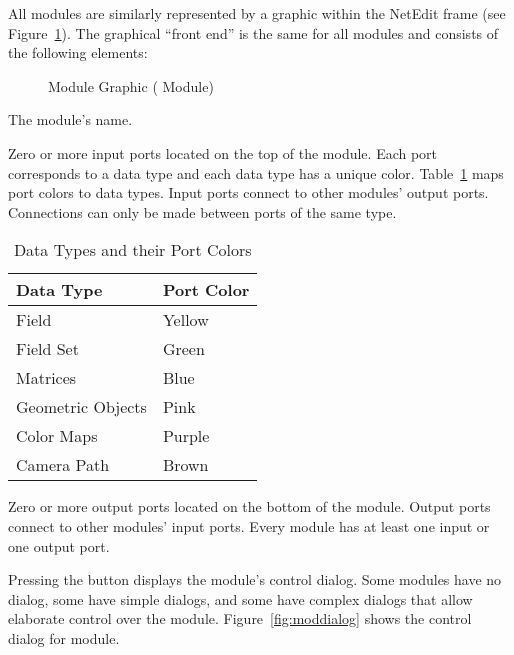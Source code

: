 All modules are similarly represented by a graphic within the NetEdit frame
(see Figure~\ref{fig:modgraphic}). The graphical ``front end'' is the same
for all modules and consists of the following elements:

\begin{figure}[htb]
  \begin{makeimage}
  \end{makeimage}
  \modgraphic
  \caption{\label{fig:modgraphic} Module Graphic ( Module)}
\end{figure}

\begin{description}
   The module's name.
  
   Zero or more input ports located on the top
  of the module.  Each port corresponds to a data type and each data
  type has a unique color.  Table~\ref{tab:portcolors} maps port
  colors to data types.  Input ports connect to other modules' output
  ports.  Connections can only be made between ports of the same type.

  \begin{table}[htbp]
    \begin{center}
      \begin{tabular}{|l|l|}
        \hline
        \textbf{Data Type} & \textbf{Port Color} \\
        \hline
        Field & Yellow \\
        Field Set & Green \\
        Matrices & Blue \\
        Geometric Objects & Pink \\
        Color Maps & Purple \\
        Camera Path & Brown \\
        \hline
      \end{tabular}
      \caption{Data Types and their Port Colors}
      \label{tab:portcolors}
    \end{center}
  \end{table}
  
   Zero or more output ports located on the
  bottom of the module.  Output ports connect to other modules' input
  ports.  Every module has  at least one input or one output
  port.
  
   Pressing the  button displays the
  module's control dialog. Some modules have no dialog, some have
  simple dialogs, and some have complex dialogs that allow
  elaborate control over the module.  Figure~\ref{fig:moddialog} shows
  the control dialog for  module.
  

\end{description}
